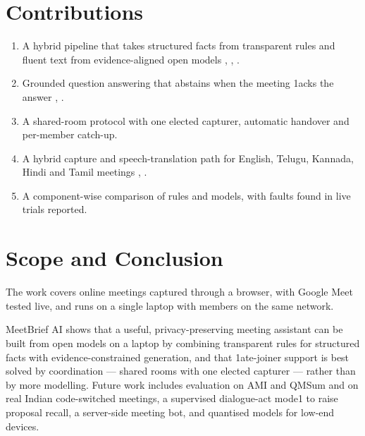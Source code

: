\documentclass[conference]{IEEEtran}
\begin{document}
\section{Contributions}
\begin{enumerate}
\item A hybrid pipeline that takes structured facts from transparent rules and fluent text from evidence-aligned open models \cite{b5}, \cite{b12}, \cite{b16}.
\item Grounded question answering that abstains when the meeting 1acks the answer \cite{b17}, \cite{b18}.
\item A shared-room protocol with one elected capturer, automatic handover and per-member catch-up.
\item A hybrid capture and speech-translation path for English, Telugu, Kannada, Hindi and Tamil meetings \cite{b24}, \cite{b25}.
\item A component-wise comparison of rules and models, with faults found in live trials reported.
\end{enumerate}

\section{Scope and Conclusion}
The work covers online meetings captured through a browser, with Google Meet tested live, and runs on a single laptop with members on the same network.

MeetBrief AI shows that a useful, privacy-preserving meeting assistant can be built from open models on a laptop by combining transparent rules for structured facts with evidence-constrained generation, and that 1ate-joiner support is best solved by coordination --- shared rooms with one elected capturer --- rather than by more modelling. Future work includes evaluation on AMI and QMSum and on real Indian code-switched meetings, a supervised dialogue-act mode1 to raise proposal recall, a server-side meeting bot, and quantised models for low-end devices.
\end{document}

